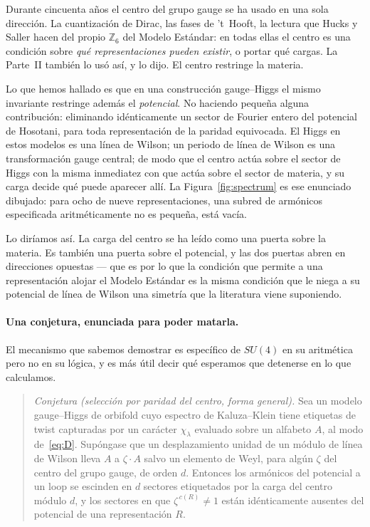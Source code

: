 \documentclass[11pt,a4paper]{article}
\newcommand{\ZZ}{\mathbb{Z}}
\begin{document}
Durante cincuenta años el centro del grupo gauge se ha usado en una sola dirección. La
cuantización de Dirac, las fases de 't~Hooft, la lectura que Hucks y Saller hacen del propio
$\ZZ_6$ del Modelo Estándar: en todas ellas el centro es una condición sobre \emph{qué
representaciones pueden existir}, o portar qué cargas. La Parte~II también lo usó así, y lo
dijo. El centro restringe la materia.

Lo que hemos hallado es que en una construcción gauge--Higgs el mismo invariante restringe
además el \emph{potencial}. No haciendo pequeña alguna contribución: eliminando idénticamente
un sector de Fourier entero del potencial de Hosotani, para toda representación de la paridad
equivocada. El Higgs en estos modelos es una línea de Wilson; un periodo de línea de Wilson es
una transformación gauge central; de modo que el centro actúa sobre el sector de Higgs con la
misma inmediatez con que actúa sobre el sector de materia, y su carga decide qué puede
aparecer allí. La Figura~\ref{fig:spectrum} es ese enunciado dibujado: para ocho de nueve
representaciones, una subred de armónicos especificada aritméticamente no es pequeña, está
vacía.

Lo diríamos así. La carga del centro se ha leído como una puerta sobre la materia. Es también
una puerta sobre el potencial, y las dos puertas abren en direcciones opuestas --- que es por
lo que la condición que permite a una representación alojar el Modelo Estándar es la misma
condición que le niega a su potencial de línea de Wilson una simetría que la literatura viene
suponiendo.

\paragraph{Una conjetura, enunciada para poder matarla.} El mecanismo que sabemos demostrar es
específico de $SU(4)$ en su aritmética pero no en su lógica, y es más útil decir qué esperamos
que detenerse en lo que calculamos.

\begin{quote}
\emph{Conjetura (selección por paridad del centro, forma general).} Sea un modelo gauge--Higgs
de orbifold cuyo espectro de Kaluza--Klein tiene etiquetas de twist capturadas por un carácter
$\chi_\lambda$ evaluado sobre un alfabeto $A$, al modo de~\eqref{eq:D}. Supóngase que un
desplazamiento unidad de un módulo de línea de Wilson lleva $A$ a $\zeta\cdot A$ salvo un
elemento de Weyl, para algún $\zeta$ del centro del grupo gauge, de orden $d$. Entonces los
armónicos del potencial a un loop se escinden en $d$ sectores etiquetados por la carga del
centro módulo $d$, y los sectores en que $\zeta^{\,c(R)}\neq1$ están idénticamente ausentes
del potencial de una representación $R$.
\end{quote}
\end{document}
